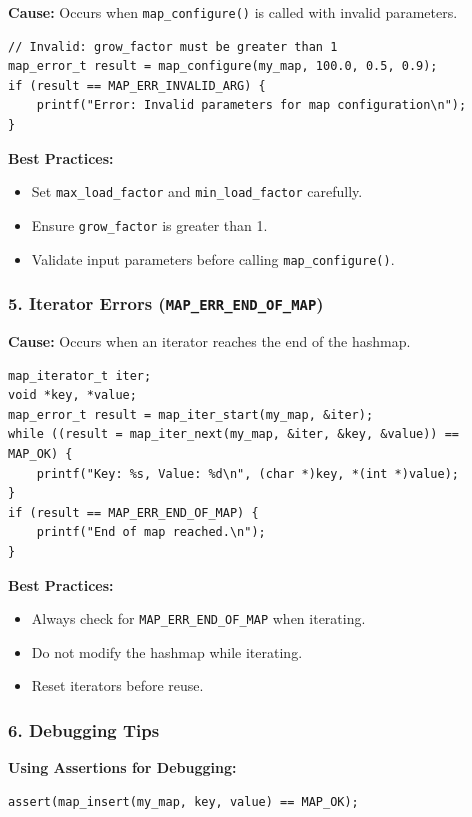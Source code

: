 \documentclass[titlepage]{article}
\begin{document}
\textbf{Cause:}
Occurs when \texttt{map\_configure()} is called with invalid parameters.

\begin{verbatim}
// Invalid: grow_factor must be greater than 1
map_error_t result = map_configure(my_map, 100.0, 0.5, 0.9);
if (result == MAP_ERR_INVALID_ARG) {
    printf("Error: Invalid parameters for map configuration\n");
}
\end{verbatim}

\textbf{Best Practices:}
\begin{itemize}
    \item Set \texttt{max\_load\_factor} and \texttt{min\_load\_factor} carefully.
    \item Ensure \texttt{grow\_factor} is greater than 1.
    \item Validate input parameters before calling \texttt{map\_configure()}.
\end{itemize}

\subsubsection{5. Iterator Errors (\texttt{MAP\_ERR\_END\_OF\_MAP})}

\textbf{Cause:}
Occurs when an iterator reaches the end of the hashmap.

\begin{verbatim}
map_iterator_t iter;
void *key, *value;
map_error_t result = map_iter_start(my_map, &iter);
while ((result = map_iter_next(my_map, &iter, &key, &value)) == MAP_OK) {
    printf("Key: %s, Value: %d\n", (char *)key, *(int *)value);
}
if (result == MAP_ERR_END_OF_MAP) {
    printf("End of map reached.\n");
}
\end{verbatim}

\textbf{Best Practices:}
\begin{itemize}
    \item Always check for \texttt{MAP\_ERR\_END\_OF\_MAP} when iterating.
    \item Do not modify the hashmap while iterating.
    \item Reset iterators before reuse.
\end{itemize}

\subsubsection{6. Debugging Tips}

\textbf{Using Assertions for Debugging:}
\begin{verbatim}
assert(map_insert(my_map, key, value) == MAP_OK);
\end{verbatim}
\end{document}
